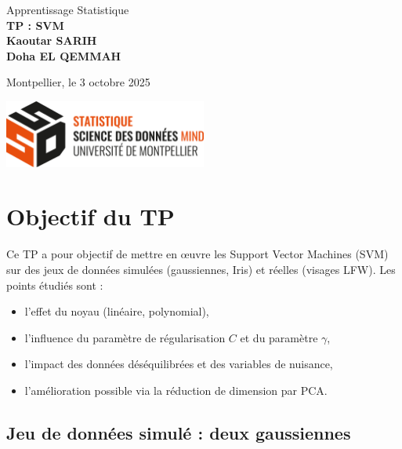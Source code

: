 \documentclass[12pt]{article}
\begin{document}
\begin{titlepage}
    \centering
    
    \vspace{1cm}
    {\Huge {Apprentissage Statistique}}\\[1.5cm]
    
    \vspace{1cm}
    {\Huge \textbf{TP : SVM}}\\[2cm]
    
    {\large
    \textbf{Kaoutar SARIH}\\ \textbf{Doha EL QEMMAH}\\[2cm]}
    
    {\large Montpellier, le 3 octobre 2025}
    
    \vfill
    
    \includegraphics[width=0.5\textwidth]{images/logo.ssd.png}\\[0.5cm]
    
\end{titlepage}

\newpage

\tableofcontents 
\newpage  
\section*{Objectif du TP}
Ce TP a pour objectif de mettre en œuvre les Support Vector Machines (SVM) sur des jeux de données simulées (gaussiennes, Iris) et réelles (visages LFW).
Les points étudiés sont :
\begin{itemize}
  \item l’effet du noyau (linéaire, polynomial),
  \item l’influence du paramètre de régularisation $C$ et du paramètre $\gamma$,
  \item l’impact des données déséquilibrées et des variables de nuisance,
  \item l’amélioration possible via la réduction de dimension par PCA.
\end{itemize}


\subsection*{Jeu de données simulé : deux gaussiennes}
\end{document}
